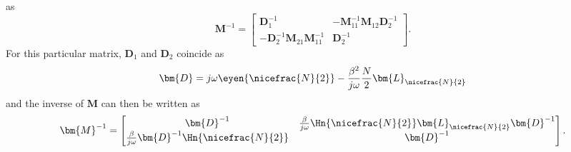 as
\begin{equation}
    \bm{M}^{-1} =
    \begin{bmatrix}
        \bm{D}_1^{-1} & -\bm{M}_{11}^{-1}\bm{M}_{12}\bm{D}_{2}^{-1} \\
        -\bm{D}_{2}^{-1}\bm{M}_{21}\bm{M}_{11}^{-1} & \bm{D}_{2}^{-1}
    \end{bmatrix}.
\end{equation}
For this particular matrix, $\bm{D}_1$ and $\bm{D}_2$ coincide as
\begin{equation}
    \label{eq:def_D}
        \bm{D} = j\omega \eyen{\nicefrac{N}{2}} - \frac{\beta^2}{j\omega}\frac{N}{2}\bm{L}_{\nicefrac{N}{2}}
\end{equation}
and the inverse of $\bm{M}$ can then be written as
\begin{equation}
    \label{eq:Minv}
    \bm{M}^{-1} =
    \begin{bmatrix}
        \bm{D}^{-1} & \frac{\beta}{j\omega}\Hn{\nicefrac{N}{2}}\bm{L}_{\nicefrac{N}{2}}\bm{D}^{-1}  \\
        \frac{\beta}{j\omega}\bm{D}^{-1}\Hn{\nicefrac{N}{2}} & \bm{D}^{-1}
    \end{bmatrix}.
\end{equation}

